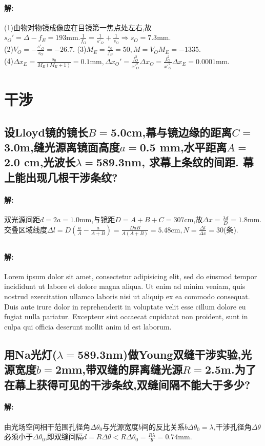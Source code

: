 \documentclass[UTF8]{article}
\newcommand{\cm}{\mathrm{cm}}
\newcommand{\mm}{\mathrm{mm}}
\newcommand{\lipsum}{Lorem ipsum dolor sit amet, consectetur adipisicing elit, sed do eiusmod tempor incididunt ut labore et dolore magna aliqua. Ut enim ad minim veniam, quis nostrud exercitation ullamco laboris nisi ut aliquip ex ea commodo consequat. Duis aute irure dolor in reprehenderit in voluptate velit esse cillum dolore eu fugiat nulla pariatur. Excepteur sint occaecat cupidatat non proident, sunt in culpa qui officia deserunt mollit anim id est laborum.}
\begin{document}
    \paragraph{解: }(1)由物对物镜成像应在目镜第一焦点处左右,故$s_O'=\Delta-f_E=193\mm. \frac{1}{f_O}=\frac{1}{s'_O}+\frac{1}{s_O}\Rightarrow s_O=7.3\mm$.\\ (2)$V_O=-\frac{s'_O}{s_O}=-26.7$. (3)$M_E=\frac{s_0}{f_E}=50,M=V_O M_E=-1335$.\\ (4)$\Delta x_E=\frac{s_0}{M_E(M_E+1)}=0.1\mm, \Delta x_O'=\frac{f^2_O}{x'^2_O}\Delta x_O=\frac{f^2_O}{x'^2_O}\Delta x_E=0.0001\mm$.

    \section{干涉}
    \setcounter{subsection}{6}
    \subsection{设Lloyd镜的镜长$B=$5.0cm,幕与镜边缘的距离$C=$3.0m,缝光源离镜面高度$a=$0.5 mm,水平距离$A=$2.0 cm,光波长$\lambda=$589.3nm, 求幕上条纹的间距. 幕上能出现几根干涉条纹?} %
    \paragraph{解: }双光源间距$d=2a=1.0\mm$,与镜距$D=A+B+C=307\cm$,故$\Delta x=\frac{\lambda d}{D}=1.8\mm.$\\ 交叠区域线度$\Delta l=D\left( \frac{a}{A}-\frac{a}{A+B} \right)=\frac{DaB}{A(A+B)}=5.48\cm,N=\frac{\Delta l}{\Delta x}=30$(条).

    \addtocounter{subsection}{1}
    \subsection{} %
    \paragraph{解: }\lipsum

    \addtocounter{subsection}{1}
    \subsection{用Na光灯($\lambda=$589.3nm)做Young双缝干涉实验,光源宽度$b=$2mm,带双缝的屏离缝光源$R=$2.5m.为了在幕上获得可见的干涉条纹,双缝间隔不能大于多少?} %
    \paragraph{解: }由光场空间相干范围孔径角$\Delta \theta_0$与光源宽度$b$间的反比关系$b\Delta \theta_0=\lambda$,干涉孔径角$\Delta \theta$必须小于$\Delta \theta_0$,即双缝间隔$d=R\Delta \theta<R\Delta \theta_0=\frac{R\lambda}{b}=0.74\mm$.
\end{document}
